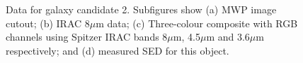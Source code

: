 \documentclass[times,usenatbib]{mn2e}
\begin{document}
\begin{figure}
\begin{center}
\caption{Data for galaxy candidate 2. Subfigures show (a) MWP image cutout; (b) IRAC 8$\mu$m data; (c) Three-colour composite with RGB channels using Spitzer IRAC bands 8$\mu$m, 4.5$\mu$m and 3.6$\mu$m respectively; and (d) measured SED for this object.}
\label{gal2}
\end{center}
\end{figure} 
\end{document}
